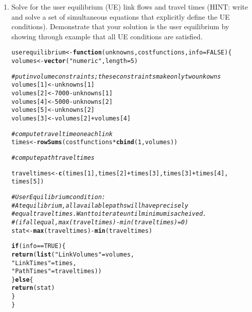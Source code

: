\documentclass{texMemo}\usepackage[]{graphicx}\usepackage[]{color}
\makeatletter
\newcommand{\hlnum}[1]{\textcolor[rgb]{0.686,0.059,0.569}{#1}}%
\newcommand{\hlstr}[1]{\textcolor[rgb]{0.192,0.494,0.8}{#1}}%
\newcommand{\hlcom}[1]{\textcolor[rgb]{0.678,0.584,0.686}{\textit{#1}}}%
\newcommand{\hlopt}[1]{\textcolor[rgb]{0,0,0}{#1}}%
\newcommand{\hlstd}[1]{\textcolor[rgb]{0.345,0.345,0.345}{#1}}%
\newcommand{\hlkwa}[1]{\textcolor[rgb]{0.161,0.373,0.58}{\textbf{#1}}}%
\newcommand{\hlkwb}[1]{\textcolor[rgb]{0.69,0.353,0.396}{#1}}%
\newcommand{\hlkwc}[1]{\textcolor[rgb]{0.333,0.667,0.333}{#1}}%
\newcommand{\hlkwd}[1]{\textcolor[rgb]{0.737,0.353,0.396}{\textbf{#1}}}%
\newenvironment{kframe}{%
 \def\at@end@of@kframe{}%
 \ifinner\ifhmode%
  \def\at@end@of@kframe{\end{minipage}}%
  \begin{minipage}{\columnwidth}%
 \fi\fi%
 \def\FrameCommand##1{\hskip\@totalleftmargin \hskip-\fboxsep
 \colorbox{shadecolor}{##1}\hskip-\fboxsep
     \hskip-\linewidth \hskip-\@totalleftmargin \hskip\columnwidth}%
 \MakeFramed {\advance\hsize-\width
   \@totalleftmargin\z@ \linewidth\hsize
   \@setminipage}}%
 {\par\unskip\endMakeFramed%
 \at@end@of@kframe}
\newenvironment{knitrout}{}{} %
\makeatother
\begin{document}
\begin{enumerate}
\item{Solve for the user equilibrium (UE) link flows and travel times (HINT:
write and  solve a set of simultaneous equations that explicitly define the UE
conditions). Demonstrate that your solution is the user equilibrium by showing
through example that all UE conditions are satisfied.}
\begin{knitrout}\small
{}\color{fgcolor}\begin{kframe}
\begin{alltt}
\hlstd{userequilibrium} \hlkwb{<-} \hlkwa{function}\hlstd{(}\hlkwc{unknowns}\hlstd{,}\hlkwc{costfunctions}\hlstd{,} \hlkwc{info}\hlstd{=}\hlnum{FALSE}\hlstd{)\{}
  \hlstd{volumes} \hlkwb{<-} \hlkwd{vector}\hlstd{(}\hlstr{"numeric"}\hlstd{,} \hlkwc{length}\hlstd{=}\hlnum{5}\hlstd{)}

  \hlcom{# put in volume constraints; these constraints make only two unkowns}
  \hlstd{volumes[}\hlnum{1}\hlstd{]} \hlkwb{<-} \hlstd{unknowns[}\hlnum{1}\hlstd{]}
  \hlstd{volumes[}\hlnum{2}\hlstd{]} \hlkwb{<-} \hlnum{7000} \hlopt{-} \hlstd{unknowns[}\hlnum{1}\hlstd{]}
  \hlstd{volumes[}\hlnum{4}\hlstd{]} \hlkwb{<-} \hlnum{5000} \hlopt{-} \hlstd{unknowns[}\hlnum{2}\hlstd{]}
  \hlstd{volumes[}\hlnum{5}\hlstd{]} \hlkwb{<-} \hlstd{unknowns[}\hlnum{2}\hlstd{]}
  \hlstd{volumes[}\hlnum{3}\hlstd{]} \hlkwb{<-} \hlstd{volumes[}\hlnum{2}\hlstd{]} \hlopt{+} \hlstd{volumes[}\hlnum{4}\hlstd{]}

  \hlcom{# compute travel time on each link}
  \hlstd{times} \hlkwb{<-} \hlkwd{rowSums}\hlstd{(costfunctions} \hlopt{*} \hlkwd{cbind}\hlstd{(}\hlnum{1}\hlstd{, volumes))}

  \hlcom{# compute path travel times}

  \hlstd{traveltimes} \hlkwb{<-} \hlkwd{c}\hlstd{(times[}\hlnum{1}\hlstd{], times[}\hlnum{2}\hlstd{]} \hlopt{+} \hlstd{times[}\hlnum{3}\hlstd{], times[}\hlnum{3}\hlstd{]}\hlopt{+}\hlstd{times[}\hlnum{4}\hlstd{],}
                   \hlstd{times[}\hlnum{5}\hlstd{])}

  \hlcom{# User Equilibrium condition:}
  \hlcom{#   At equilibrium, all available paths will have precisely}
  \hlcom{#   equal travel times. Want to iterate until minimum is acheived.}
  \hlcom{#   (if all equal, max(traveltimes) - min(traveltimes) = 0)}
  \hlstd{stat} \hlkwb{<-} \hlkwd{max}\hlstd{(traveltimes)} \hlopt{-} \hlkwd{min}\hlstd{(traveltimes)}


  \hlkwa{if}\hlstd{(info}\hlopt{==}\hlnum{TRUE}\hlstd{)\{}
    \hlkwd{return}\hlstd{(}\hlkwd{list}\hlstd{(}\hlstr{"Link Volumes"}\hlstd{= volumes,}
                \hlstr{"Link Times"} \hlstd{= times,}
                \hlstr{"Path Times"} \hlstd{= traveltimes))}
  \hlstd{\}}\hlkwa{else}\hlstd{\{}
    \hlkwd{return}\hlstd{(stat)}
  \hlstd{\}}
\hlstd{\}}


\end{alltt}
\end{kframe}
\end{knitrout}
\end{enumerate}
\end{document}
